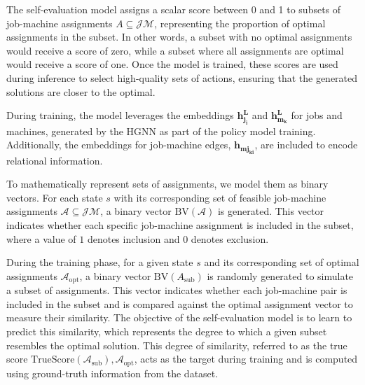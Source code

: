 The self-evaluation model assigns a scalar score between 0 and 1 to subsets of job-machine assignments \( A \subseteq \mathcal{JM} \), representing the proportion of optimal assignments in the subset. In other words, a subset with no optimal assignments would receive a score of zero, while a subset where all assignments are optimal would receive a score of one. Once the model is trained, these scores are used during inference to  select high-quality sets of actions, ensuring that the generated solutions are closer to the optimal.

During training, the model leverages the embeddings $\boldsymbol{h_{j_{i}}^L}$ and $\boldsymbol{h_{m_{k}}^L}$ for jobs and machines, generated by the HGNN as part of the policy model training. Additionally, the embeddings for job-machine edges, $\boldsymbol{h_{mj_{ki}}}$, are included to encode relational information.

To mathematically represent sets of assignments, we model them as binary vectors. For each state \( s \) with its corresponding set of feasible job-machine assignments \( \mathcal{A} \subseteq \mathcal{JM} \), a binary vector \( \text{BV}(\mathcal{A}) \) is generated. This vector indicates whether each specific job-machine assignment is included in the subset, where a value of \( 1 \) denotes inclusion and \( 0 \) denotes exclusion.

During the training phase, for a given state \( s \) and its corresponding set of optimal assignments \( \mathcal{A}_{\text{opt}} \), a binary vector \( \text{BV}(A_\text{sub}) \) is randomly generated to simulate a subset of assignments. This vector indicates whether each job-machine pair is included in the subset and is compared against the optimal assignment vector to measure their similarity. The objective of the self-evaluation model is to learn to predict this similarity, which represents the degree to which a given subset resembles the optimal solution. This degree of similarity, referred to as the true score \( \text{TrueScore}(\mathcal{A}_\text{sub}),  \mathcal{A}_{\text{opt}} \), acts as the target during training and is computed using ground-truth information from the dataset.

